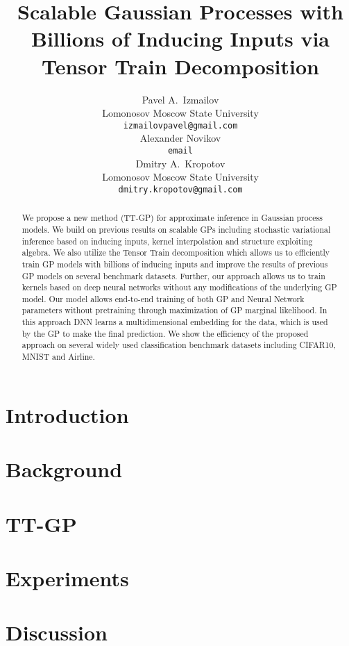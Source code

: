 \documentclass{article}
\title{Scalable Gaussian Processes with Billions of Inducing Inputs via Tensor Train 
      Decomposition}
\author{
  Pavel A.~Izmailov \\
  Lomonosov Moscow State University\\
  \texttt{izmailovpavel@gmail.com} \\
  \And
  Alexander Novikov\\
  \texttt{email} \\
  \AND
  Dmitry A.~Kropotov \\
  Lomonosov Moscow State University\\
  \texttt{dmitry.kropotov@gmail.com} \\
}
\begin{document}

\maketitle

\begin{abstract}
  We propose a new method (TT-GP) for approximate inference in Gaussian process 
  models. We build on previous results on scalable GPs including stochastic 
  variational inference based on inducing inputs, kernel interpolation and 
  structure exploiting algebra. We also utilize the Tensor Train decomposition
  which allows us to efficiently train GP models with billions of 
  inducing inputs and improve the results of previous GP models on several
  benchmark datasets. Further, our approach allows us to train kernels based on
  deep neural networks without any modifications of the underlying GP model. 
  Our model allows end-to-end training of both GP and Neural Network parameters
  without pretraining through maximization of GP marginal likelihood. In this 
  approach DNN learns a multidimensional embedding for the data, which is
  used by the GP to make the final prediction. We show the efficiency of the
  proposed approach on several widely used classification benchmark datasets 
  including CIFAR10, MNIST and Airline.

\end{abstract}

\section{Introduction}
  

\section {Background}
  
\section{TT-GP}
  

\section{Experiments}
  

%  

\section{Discussion}
  




\end{document}
